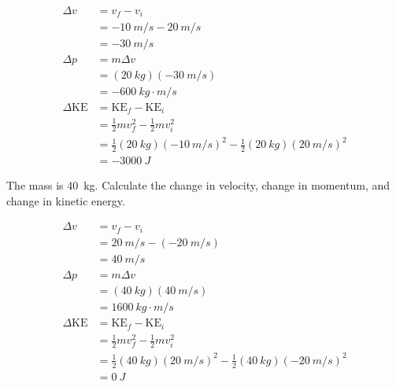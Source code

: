 \documentclass[]{exam}
\begin{document}
\begin{questions}
\begin{solution}
\begin{align*}
    \Delta v &= v_f - v_i \\[1ex]
    &= \SI{-10}{m/s} - \SI{20}{m/s} \\[1ex]
    &= \boxed{\SI{-30}{m/s}} \\[2ex]
    \Delta p &= m \Delta v \\[1ex]
    &= (\SI{20}{kg})(\SI{-30}{m/s}) \\[1ex]
    &= \boxed{\SI{-600}{kg\cdot m/s}} \\[2ex]
    \Delta \mathrm{KE} &= \mathrm{KE}_f - \mathrm{KE}_i \\[1ex]
    &= \frac{1}{2}m v_f^2 - \frac{1}{2}mv_i^2 \\[1ex]
    &= \frac{1}{2}(\SI{20}{kg})(\SI{-10}{m/s})^2 - \frac{1}{2}(\SI{20}{kg}) (\SI{20}{m/s})^2 \\[1ex]
    &= \boxed{\SI{-3000}{J}}
\end{align*}
\end{solution}


\ifprintanswers
    \clearpage
\fi
\question
The mass is \SI{40}{kg}. Calculate the change in velocity, change in momentum, and change in kinetic energy. 

\begin{center}
\end{center}

\begin{solution}
\begin{align*}
    \Delta v &= v_f - v_i \\[1ex]
    &= \SI{20}{m/s} - (\SI{-20}{m/s}) \\[1ex]
    &= \boxed{\SI{40}{m/s}} \\[2ex]
    \Delta p &= m \Delta v \\[1ex]
    &= (\SI{40}{kg})(\SI{40}{m/s}) \\[1ex]
    &= \boxed{\SI{1600}{kg\cdot m/s}} \\[2ex]
    \Delta \mathrm{KE} &= \mathrm{KE}_f - \mathrm{KE}_i \\[1ex]
    &= \frac{1}{2}m v_f^2 - \frac{1}{2}mv_i^2 \\[1ex]
    &= \frac{1}{2}(\SI{40}{kg})(\SI{20}{m/s})^2 - \frac{1}{2}(\SI{40}{kg}) (\SI{-20}{m/s})^2 \\[1ex]
    &= \boxed{\SI{0}{J}}
\end{align*}
\end{solution}



\end{questions}
\end{document}
